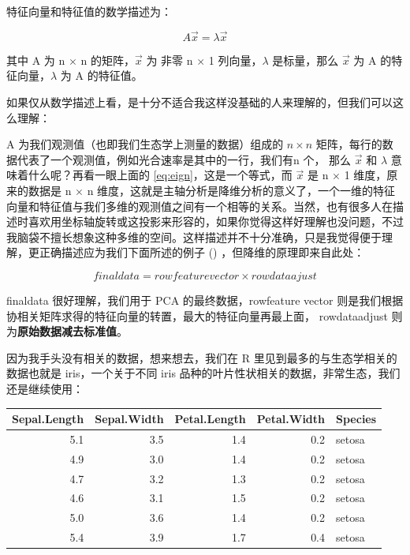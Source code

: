 \documentclass[
]{krantz}
\begin{document}
特征向量和特征值的数学描述为：

\begin{equation}
A \vec{x} = \lambda \vec{x}
\label{eq:eign}
\end{equation}

其中 A 为 n \(\times\) n 的矩阵，\(\vec{x}\) 为 非零 n \(\times\) 1 列向量，\(\lambda\) 是标量，那么 \(\vec{x}\) 为 A 的特征向量，\(\lambda\) 为 A 的特征值。

如果仅从数学描述上看，是十分不适合我这样没基础的人来理解的，但我们可以这么理解：

A 为我们观测值（也即我们生态学上测量的数据）组成的 \(n \times n\) 矩阵，每行的数据代表了一个观测值，例如光合速率是其中的一行，我们有n 个， 那么 \(\vec{x}\) 和 \(\lambda\) 意味着什么呢？再看一眼上面的 \eqref{eq:eign}，这是一个等式，而 \(\vec{x}\) 是 n \(\times\) 1 维度，原来的数据是 n \(\times\) n 维度，这就是主轴分析是降维分析的意义了，一个一维的特征向量和特征值与我们多维的观测值之间有一个相等的关系。当然，也有很多人在描述时喜欢用坐标轴旋转或这投影来形容的，如果你觉得这样好理解也没问题，不过我脑袋不擅长想象这种多维的空间。这样描述并不十分准确，只是我觉得便于理解，更正确描述应为我们下面所述的例子 (\citet{Smith2002}) ，但降维的原理即来自此处：

\begin{equation}
finaldata = rowfeaturevector \times rowdataajust
\label{eq:despca}
\end{equation}

finaldata 很好理解，我们用于 PCA 的最终数据，rowfeature vector 则是我们根据协相关矩阵求得的特征向量的转置，最大的特征向量再最上面， rowdataadjust 则为\textbf{原始数据减去标准值}。

因为我手头没有相关的数据，想来想去，我们在 R 里见到最多的与生态学相关的数据也就是 iris，一个关于不同 iris 品种的叶片性状相关的数据，非常生态，我们还是继续使用：

\begin{tabular}{r|r|r|r|l}
\hline
Sepal.Length & Sepal.Width & Petal.Length & Petal.Width & Species\\
\hline
5.1 & 3.5 & 1.4 & 0.2 & setosa\\
\hline
4.9 & 3.0 & 1.4 & 0.2 & setosa\\
\hline
4.7 & 3.2 & 1.3 & 0.2 & setosa\\
\hline
4.6 & 3.1 & 1.5 & 0.2 & setosa\\
\hline
5.0 & 3.6 & 1.4 & 0.2 & setosa\\
\hline
5.4 & 3.9 & 1.7 & 0.4 & setosa\\
\hline
\end{tabular}
\end{document}
